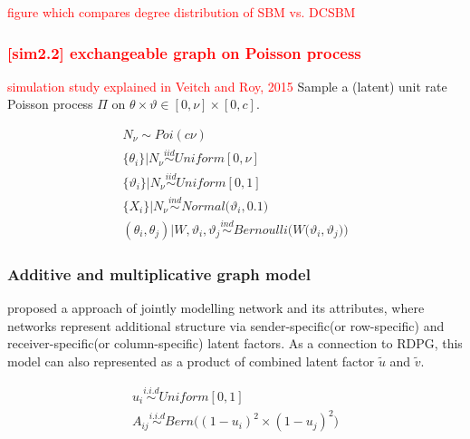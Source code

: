 \documentclass[12pt]{article}
\theoremstyle{definition}
\begin{document}
	
	
	
	
\textcolor{red}{figure which compares degree distribution of SBM vs. DCSBM}
	
\subsubsection{\textcolor{red}{[sim2.2] exchangeable graph on Poisson process}}
	
	
	\textcolor{red}{simulation study explained in Veitch and Roy, 2015}
	Sample a (latent) unit rate Poisson process $\Pi$ on $\theta \times \vartheta \in [0, \nu] \times [0, c]$.
	
	\begin{equation}
	\begin{gathered}
	N_{\nu} \sim Poi( c \nu) \\ 
	\{ \theta_{i} \} \big| N_{\nu} \overset{iid}{\sim} Uniform[0, \nu]  \\ 
	\{ \vartheta_{i} \} \big| N_{\nu} \overset{iid}{\sim} Uniform[0,1] \\ 
	\{ X_{i}  \} | N_{\nu} \overset{ind}{\sim} Normal \big( \vartheta_{i}, 0.1 \big)  \\ 
	(\theta_{i}, \theta_{j}) \big| W, \vartheta_{i}, \vartheta_{j} \overset{ind}{\sim} Bernoulli \big( W\big( \vartheta_{i}, \vartheta_{j} \big) \big) 
	\end{gathered}
	\end{equation}
	
	
	
\subsubsection{Additive and multiplicative graph model}
	
\cite{hoff2002latent} proposed a approach of jointly modelling network and its attributes, where networks represent additional structure via sender-specific(or row-specific) and receiver-specific(or column-specific) latent factors.
As a connection to RDPG, this model can also represented as a product of combined latent factor $\tilde{u}$ and $\tilde{v}$. 
	
\begin{equation}
\begin{gathered}
	u_{i} \overset{i.i.d}{\sim} Uniform[0,1] \\ 
	A_{ij}  \overset{i.i.d}{\sim} Bern \big(  ( 1 - u_{i})^2 \times (1 - u_{j})^2    \big)
\end{gathered}
\end{equation}
	
\end{document}

